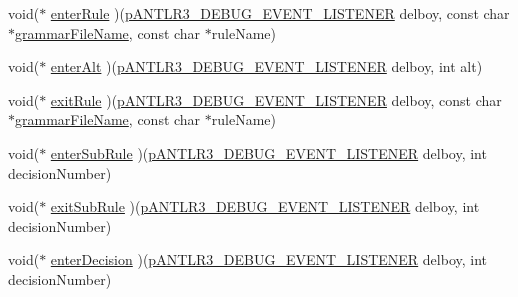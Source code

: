 \begin{DoxyCompactItemize}
\item 
void($\ast$ \hyperlink{struct_a_n_t_l_r3___d_e_b_u_g___e_v_e_n_t___l_i_s_t_e_n_e_r__struct_ac857f7eb0e3a8ac76119735c2e089961}{enter\-Rule} )(\hyperlink{antlr3interfaces_8h_ab226a624395fcc0b8fe2b29ae60b6116}{p\-A\-N\-T\-L\-R3\-\_\-\-D\-E\-B\-U\-G\-\_\-\-E\-V\-E\-N\-T\-\_\-\-L\-I\-S\-T\-E\-N\-E\-R} delboy, const char $\ast$\hyperlink{struct_a_n_t_l_r3___d_e_b_u_g___e_v_e_n_t___l_i_s_t_e_n_e_r__struct_a4f01c6add4000cd36d700e22754e55a8}{grammar\-File\-Name}, const char $\ast$rule\-Name)
\item 
void($\ast$ \hyperlink{struct_a_n_t_l_r3___d_e_b_u_g___e_v_e_n_t___l_i_s_t_e_n_e_r__struct_a7a37a4a27edfab60086ae2c390946322}{enter\-Alt} )(\hyperlink{antlr3interfaces_8h_ab226a624395fcc0b8fe2b29ae60b6116}{p\-A\-N\-T\-L\-R3\-\_\-\-D\-E\-B\-U\-G\-\_\-\-E\-V\-E\-N\-T\-\_\-\-L\-I\-S\-T\-E\-N\-E\-R} delboy, int alt)
\item 
void($\ast$ \hyperlink{struct_a_n_t_l_r3___d_e_b_u_g___e_v_e_n_t___l_i_s_t_e_n_e_r__struct_ae8755b1f41540b344fae90a94d3a3ba8}{exit\-Rule} )(\hyperlink{antlr3interfaces_8h_ab226a624395fcc0b8fe2b29ae60b6116}{p\-A\-N\-T\-L\-R3\-\_\-\-D\-E\-B\-U\-G\-\_\-\-E\-V\-E\-N\-T\-\_\-\-L\-I\-S\-T\-E\-N\-E\-R} delboy, const char $\ast$\hyperlink{struct_a_n_t_l_r3___d_e_b_u_g___e_v_e_n_t___l_i_s_t_e_n_e_r__struct_a4f01c6add4000cd36d700e22754e55a8}{grammar\-File\-Name}, const char $\ast$rule\-Name)
\item 
void($\ast$ \hyperlink{struct_a_n_t_l_r3___d_e_b_u_g___e_v_e_n_t___l_i_s_t_e_n_e_r__struct_a1f36733161c1f98cd9876d4e5ac572a2}{enter\-Sub\-Rule} )(\hyperlink{antlr3interfaces_8h_ab226a624395fcc0b8fe2b29ae60b6116}{p\-A\-N\-T\-L\-R3\-\_\-\-D\-E\-B\-U\-G\-\_\-\-E\-V\-E\-N\-T\-\_\-\-L\-I\-S\-T\-E\-N\-E\-R} delboy, int decision\-Number)
\item 
void($\ast$ \hyperlink{struct_a_n_t_l_r3___d_e_b_u_g___e_v_e_n_t___l_i_s_t_e_n_e_r__struct_a29c55fdd3dc6399e0b89303694fac424}{exit\-Sub\-Rule} )(\hyperlink{antlr3interfaces_8h_ab226a624395fcc0b8fe2b29ae60b6116}{p\-A\-N\-T\-L\-R3\-\_\-\-D\-E\-B\-U\-G\-\_\-\-E\-V\-E\-N\-T\-\_\-\-L\-I\-S\-T\-E\-N\-E\-R} delboy, int decision\-Number)
\item 
void($\ast$ \hyperlink{struct_a_n_t_l_r3___d_e_b_u_g___e_v_e_n_t___l_i_s_t_e_n_e_r__struct_a793a0776b6f77f5aea2dc58c9ddddfba}{enter\-Decision} )(\hyperlink{antlr3interfaces_8h_ab226a624395fcc0b8fe2b29ae60b6116}{p\-A\-N\-T\-L\-R3\-\_\-\-D\-E\-B\-U\-G\-\_\-\-E\-V\-E\-N\-T\-\_\-\-L\-I\-S\-T\-E\-N\-E\-R} delboy, int decision\-Number)
\item 

\end{DoxyCompactItemize}
